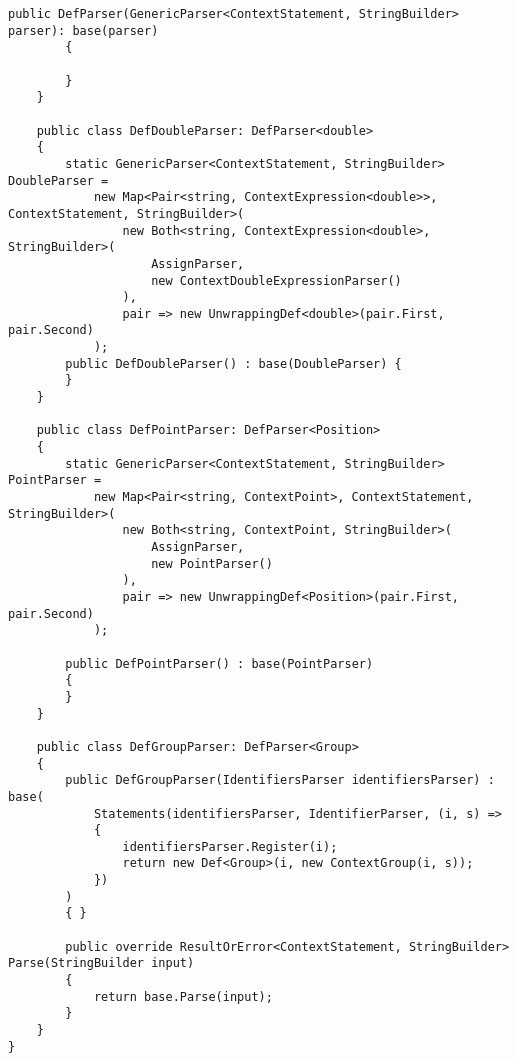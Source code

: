 \documentclass{scrartcl}
\begin{document}
\begin{lstlisting}[language={[Sharp]C}, caption={Def}, label={experiment}]
        public DefParser(GenericParser<ContextStatement, StringBuilder> parser): base(parser)
        {

        }
    }

    public class DefDoubleParser: DefParser<double>
    {
        static GenericParser<ContextStatement, StringBuilder> DoubleParser =
            new Map<Pair<string, ContextExpression<double>>, ContextStatement, StringBuilder>(
                new Both<string, ContextExpression<double>, StringBuilder>(
                    AssignParser,
                    new ContextDoubleExpressionParser()
                ),
                pair => new UnwrappingDef<double>(pair.First, pair.Second)
            );
        public DefDoubleParser() : base(DoubleParser) {
        }
    }

    public class DefPointParser: DefParser<Position>
    {
        static GenericParser<ContextStatement, StringBuilder> PointParser =
            new Map<Pair<string, ContextPoint>, ContextStatement, StringBuilder>(
                new Both<string, ContextPoint, StringBuilder>(
                    AssignParser,
                    new PointParser()
                ),
                pair => new UnwrappingDef<Position>(pair.First, pair.Second)
            );

        public DefPointParser() : base(PointParser)
        {
        }
    }

    public class DefGroupParser: DefParser<Group>
    {
        public DefGroupParser(IdentifiersParser identifiersParser) : base(
            Statements(identifiersParser, IdentifierParser, (i, s) =>
            {
                identifiersParser.Register(i);
                return new Def<Group>(i, new ContextGroup(i, s));
            })
        )
        { }

        public override ResultOrError<ContextStatement, StringBuilder> Parse(StringBuilder input)
        {
            return base.Parse(input);
        }
    }
}

\end{lstlisting}
\end{document}

